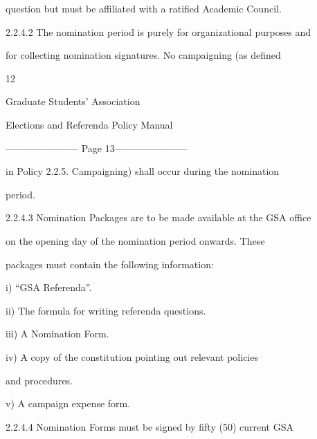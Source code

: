                question but must be affiliated with a ratified Academic Council.   

  

2.2.4.2        The nomination period is purely for organizational  purposes and  

               for collecting nomination signatures. No campaigning (as defined  

                                                       12  

                                                                                                               

                                Graduate Students’ Association  

                          Elections and Referenda Policy Manual  

  


----------------------- Page 13-----------------------

                in Policy  2.2.5. Campaigning) shall occur during the nomination  

                period.   

  

  

2.2.4.3         Nomination Packages are to be made available at the GSA office  

                on  the  opening  day  of  the  nomination  period  onwards.  These  

                packages must contain the following information:   

  

                   i)       “GSA Referenda”.  

  

                   ii)      The formula for writing referenda questions.  

  

                   iii)     A Nomination Form.  

  

                   iv)      A copy of the constitution pointing out relevant policies  

                            and procedures.   

  

                   v)       A campaign expense form.   

  

2.2.4.4         Nomination  Forms  must  be  signed  by  fifty  (50)  current  GSA  

